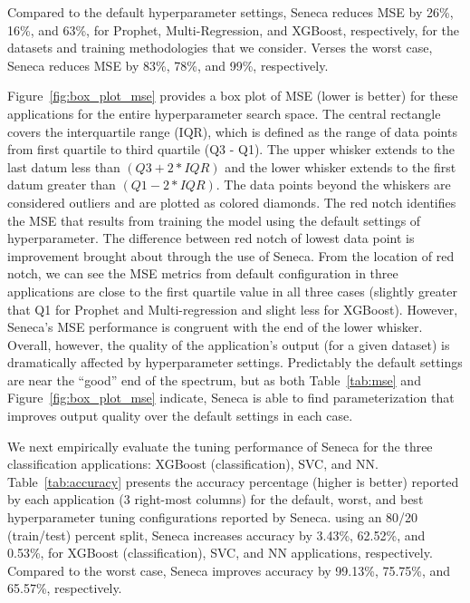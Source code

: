Compared to the default hyperparameter settings,
Seneca reduces MSE by 26\%, 16\%, and 63\%, for Prophet, Multi-Regression, and XGBoost,
respectively, for the datasets and training methodologies that we consider.
Verses the worst case, Seneca reduces MSE by 83\%, 78\%, and 99\%, respectively.

Figure~\ref{fig:box_plot_mse} provides a box plot of MSE (lower is better) for
these applications for the entire hyperparameter search space. The central
rectangle covers the interquartile range (IQR), which is defined as the range
of data points from first quartile to third quartile (Q3 - Q1).  The upper
whisker extends to the last datum less than \texttt{$(Q3 + 2 * IQR)$} and the
lower whisker extends to the first datum greater than \texttt{$(Q1 - 2 *
IQR)$}. The data points beyond the whiskers are considered outliers and are
plotted as colored diamonds. The red notch identifies the MSE that results
from training the model using the default settings of hyperparameter. The
difference between red notch of lowest data point is improvement brought about
through the use of Seneca. From the location of red notch, we can see the MSE
metrics from default configuration in three applications are close to the
first quartile value in all three cases (slightly greater that Q1 for Prophet
and Multi-regression and slight less for XGBoost). However, Seneca's MSE
performance is congruent with the end of the lower whisker.  Overall, however,
the quality of the application's output (for a given dataset) is dramatically
affected by hyperparameter settings.  Predictably the default settings are
near the ``good'' end of the spectrum, but as both Table~\ref{tab:mse} and
Figure~\ref{fig:box_plot_mse} indicate, Seneca is able to find
parameterization that improves output quality over the default settings
in each case.

We next empirically evaluate the tuning performance of Seneca for the three
classification applications: XGBoost (classification), SVC, and NN.
Table~\ref{tab:accuracy} presents the accuracy percentage (higher is
better) reported by each application (3 right-most columns) for the default,
worst, and best hyperparameter tuning configurations reported by Seneca.
using an 80/20 (train/test) percent split,
Seneca increases accuracy by 3.43\%, 62.52\%, and 0.53\%, for XGBoost
(classification), SVC, and NN applications, respectively.  Compared to
the worst case, Seneca improves accuracy by 99.13\%, 75.75\%, and 65.57\%,
respectively.


